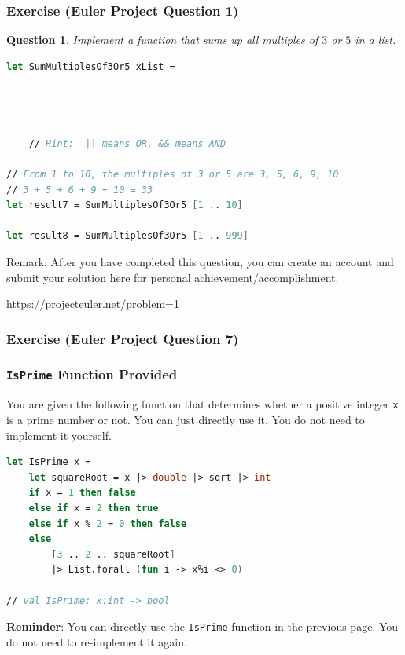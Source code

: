 \documentclass[12pt]{article}
\newtheorem*{question*}{Question}
\begin{document}
\subsubsection*{Exercise (Euler Project Question 1)}

\begin{question*}
Implement a function that sums up all multiples of $3$ or $5$ in a list.
\end{question*}

\begin{lstlisting}[language=FSharp]
let SumMultiplesOf3Or5 xList =




    // Hint:  || means OR, && means AND

// From 1 to 10, the multiples of 3 or 5 are 3, 5, 6, 9, 10
// 3 + 5 + 6 + 9 + 10 = 33
let result7 = SumMultiplesOf3Or5 [1 .. 10]

let result8 = SumMultiplesOf3Or5 [1 .. 999]
\end{lstlisting}

Remark: After you have completed this question, you can create an account and submit your solution here for personal achievement/accomplishment.

\url{https://projecteuler.net/problem=1}

\pagebreak


\subsubsection*{Exercise (Euler Project Question 7)}

\subsubsection*{\texttt{IsPrime} Function Provided}
You are given the following function that determines whether a positive integer \texttt{x} is a prime number or not. You can just directly use it. You do not need to implement it yourself.
\begin{lstlisting}[language=FSharp]
let IsPrime x =
    let squareRoot = x |> double |> sqrt |> int 
    if x = 1 then false
    else if x = 2 then true
    else if x % 2 = 0 then false
    else 
        [3 .. 2 .. squareRoot]
        |> List.forall (fun i -> x%i <> 0)

// val IsPrime: x:int -> bool
\end{lstlisting}
\textbf{Reminder}: You can directly use the \texttt{IsPrime} function in the previous page. You do not need to re-implement it again.
\end{document}
